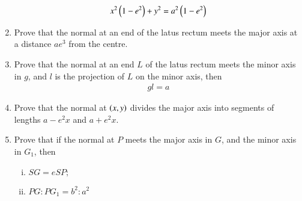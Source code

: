\begin{enumerate}[1.]
\begin{align*}
x^2\left(1-e^2\right)+y^2=a^2\left(1-e^2\right)
\end{align*}
\item Prove that the normal at an end of the latus rectum meets the major axis at a distance $ae^3$ from the centre.
\item Prove that the normal at an end $L$ of the latus rectum meets the minor axis in $g$, and $l$ is the projection of $L$ on the
minor axis, then
\begin{align*}
gl=a
\end{align*}
\item Prove that the normal at $\left(x,y\right)$ divides the major axis into segments of lengths $a-e^2x$ and $a+e^2x$.
\item Prove that if the normal at $P$ meets the major axis in $G$, and the minor axis in $G_1$, then
\begin{enumerate}[(i)]
\item $SG=eSP;$
\item $PG:PG_1 = b^2:a^2$
\end{enumerate}

\end{enumerate}